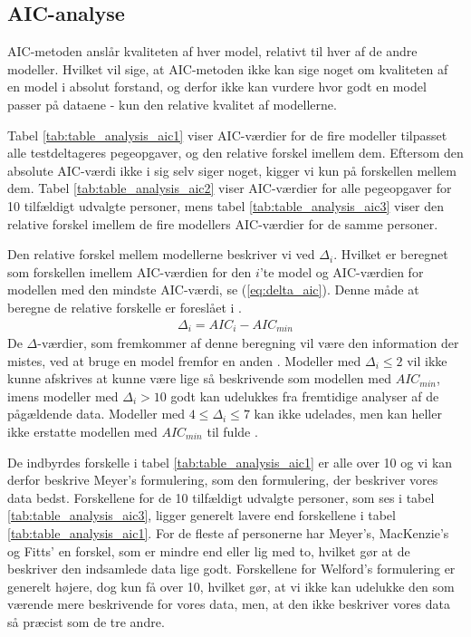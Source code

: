 \subsection*{AIC-analyse}
AIC-metoden anslår kvaliteten af hver model, relativt til hver af de andre modeller. Hvilket vil sige, at AIC-metoden ikke kan sige noget om kvaliteten af en model i absolut forstand, og derfor ikke kan vurdere hvor godt en model passer på dataene - kun den relative kvalitet af modellerne.

Tabel \ref{tab:table_analysis_aic1} viser AIC-værdier for de fire modeller tilpasset alle testdeltageres pegeopgaver, og den relative forskel imellem dem. Eftersom den absolute AIC-værdi ikke i sig selv siger noget, kigger vi kun på forskellen mellem dem. Tabel \ref{tab:table_analysis_aic2} viser AIC-værdier for alle pegeopgaver for 10 tilfældigt udvalgte personer, mens tabel \ref{tab:table_analysis_aic3} viser den relative forskel imellem de fire modellers AIC-værdier for de samme personer.

Den relative forskel mellem modellerne beskriver vi ved $\Delta_i$. Hvilket er beregnet som forskellen imellem AIC-værdien for den $i$'te model og AIC-værdien for modellen med den mindste AIC-værdi, se (\ref{eq:delta_aic}). Denne måde at beregne de relative forskelle er foreslået i \cite{burnham2004}.
\begin{align}
\Delta_i = AIC_i - AIC_{min}
\label{eq:delta_aic}
\end{align} 
De $\Delta$-værdier, som fremkommer af denne beregning vil være den information der mistes, ved at bruge en model fremfor en anden \cite{burnham2004}. Modeller med $\Delta_i \leq 2$ vil ikke kunne afskrives at kunne være lige så beskrivende som modellen med $AIC_{min}$, imens modeller med $\Delta_i > 10$ godt kan udelukkes fra fremtidige analyser af de pågældende data. Modeller med $4 \leq \Delta_i \leq 7$ kan ikke udelades, men kan heller ikke erstatte modellen med $AIC_{min}$ til fulde \cite{burnham2004}.

De indbyrdes forskelle i tabel \ref{tab:table_analysis_aic1} er alle over 10 og vi kan derfor beskrive Meyer's formulering, som den formulering, der beskriver vores data bedst. Forskellene for de 10 tilfældigt udvalgte personer, som ses i tabel \ref{tab:table_analysis_aic3}, ligger generelt lavere end forskellene i tabel \ref{tab:table_analysis_aic1}. For de fleste af personerne har Meyer's, MacKenzie's og Fitts' en forskel, som er mindre end eller lig med to, hvilket gør at de beskriver den indsamlede data lige godt. Forskellene for Welford's formulering er generelt højere, dog kun få over 10, hvilket gør, at vi ikke kan udelukke den som værende mere beskrivende for vores data, men, at den ikke beskriver vores data så præcist som de tre andre. 

